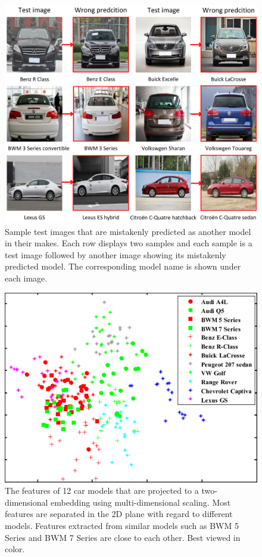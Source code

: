\documentclass[10pt,twocolumn,letterpaper]{article}
\begin{document}
\begin{figure}[t]\centering
\includegraphics[width=1\linewidth]{cls_err.pdf}
\caption{Sample test images that are mistakenly predicted as another model in their makes. Each row displays two samples and each sample is a test image followed by another image showing its mistakenly predicted model. The corresponding model name is shown under each image.}
\label{fig:cls_err}
\vspace{-3pt}
\end{figure}

\begin{figure}[t]\centering
\includegraphics[width=1.0\linewidth]{sample_dist.pdf}
\caption{The features of 12 car models that are projected to a two-dimensional embedding using multi-dimensional scaling. Most features are separated in the 2D plane with regard to different models. Features extracted from similar models such as BWM 5 Series and BWM 7 Series are close to each other. Best viewed in color.}
\label{fig:dist}
\vskip -0.35cm
\end{figure}
\end{document}
